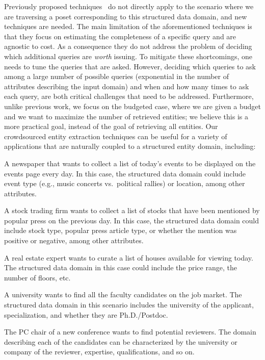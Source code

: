 Previously proposed techniques~\cite{trushkowsky:2013} do not directly apply to the scenario where we are traversing a poset corresponding to this structured data domain, and new techniques are needed. The main limitation of the aforementioned techniques is that they focus on estimating the completeness of a specific query and are agnostic to cost. As a consequence they do not address the problem of deciding which additional queries are \emph{worth} issuing.  To mitigate these shortcomings, one needs to tune the queries that are asked. However, deciding which queries to ask among a large number of possible queries (exponential in the number of attributes describing the input domain) and when and how many times to ask each query, are both critical challenges that need to be addressed. Furthermore, unlike previous work, we focus on the budgeted case, where we are given a budget and we want to maximize the number of retrieved entities; we believe this is a more practical goal, instead of the goal of retrieving all entities.  
Our crowdsourced entity extraction techniques can be useful for a variety of applications that are naturally coupled to a structured entity domain, including:
\squishlist
\item A newspaper that wants to collect a list of today's events to be displayed on the events page every day. 
In this case, the structured data domain could include event type (e.g., music concerts vs.~political rallies) or location, among other attributes.
\item A stock trading firm wants to collect a list of stocks that have been mentioned by popular press on the previous day. In this case, the structured data domain could include stock type, popular press article type, or whether the mention was positive or negative, among other attributes. 
\item A real estate expert wants to curate a list of houses available for viewing today. The structured data domain in this case could include the price range, the number of floors, etc.
\item A university wants to find all the faculty candidates on the job market. The structured data domain in this scenario includes the university of the applicant, specialization, and whether they are Ph.D./Postdoc.
\item The PC chair of a new conference wants to find potential reviewers. The domain describing each of the candidates can be characterized by the university or company of the reviewer, expertise, qualifications, and so on. 
\squishend


